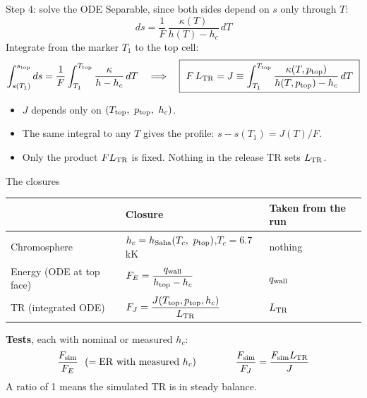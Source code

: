 \documentclass[aspectratio=169,10pt]{beamer}
\newcommand{\ptop}{p_{\rm top}}
\newcommand{\Ttop}{T_{\rm top}}
\newcommand{\htop}{h_{\rm top}}
\newcommand{\qwall}{q_{\rm wall}}
\newcommand{\LTR}{L_{\rm TR}}
\newcommand{\Fsim}{F_{\rm sim}}
\newcommand{\ER}{\mathrm{ER}}
\begin{document}
\begin{frame}{Step 4: solve the ODE}
  Separable, since both sides depend on $s$ only through $T$:
  \[
    ds = \frac{1}{F}\,\frac{\kappa(T)}{h(T)-h_c}\,dT
  \]
  Integrate from the marker $T_1$ to the top cell:
  \[
    \int_{s(T_1)}^{s_{\rm top}} ds
      = \frac{1}{F}\int_{T_1}^{\Ttop}\frac{\kappa}{h-h_c}\,dT
    \quad\Longrightarrow\quad
    \boxed{\ F\,\LTR = J \equiv \int_{T_1}^{\Ttop}\frac{\kappa(T,\ptop)}{h(T,\ptop)-h_c}\,dT\ }
  \]
  \vspace{2pt}
  \begin{itemize}\itemsep4pt
    \item $J$ depends only on $(\Ttop,\ \ptop,\ h_c)$.
    \item The same integral to any $T$ gives the profile:
          $s - s(T_1) = J(T)/F$.
    \item Only the product $F\LTR$ is fixed. Nothing in the release TR sets
          $\LTR$.
  \end{itemize}
\end{frame}

\begin{frame}{The closures}
  \renewcommand{\arraystretch}{1.6}
  \begin{center}
    \begin{tabular}{@{}lll@{}}
      \toprule
      & Closure & Taken from the run \\
      \midrule
      Chromosphere & $h_c = h_{\rm Saha}(T_c,\ \ptop)$,\quad $T_c = 6.7$\,kK
        & nothing \\
      Energy (ODE at top face) & $F_E = \dfrac{\qwall}{\htop - h_c}$ & $\qwall$ \\
      TR (integrated ODE) & $F_J = \dfrac{J(\Ttop,\ptop,h_c)}{\LTR}$ & $\LTR$ \\
      \bottomrule
    \end{tabular}
  \end{center}
  \vspace{6pt}
  \textbf{Tests}, each with nominal or measured $h_c$:
  \[
    \frac{\Fsim}{F_E}\ \ (=\ER\ \text{with measured } h_c)
    \qquad\qquad
    \frac{\Fsim}{F_J} = \frac{\Fsim\LTR}{J}
  \]
  \small A ratio of 1 means the simulated TR is in steady balance.
\end{frame}
\end{document}
